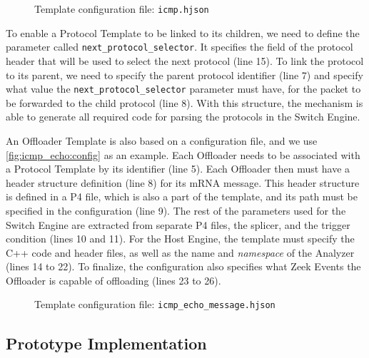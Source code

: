 \begin{figure}[htb]
    \caption{Template configuration file: \texttt{icmp.hjson}}
    \begin{center}
        
    \end{center}
    \label{fig:icmp_template:config}
\end{figure}

To enable a Protocol Template to be linked to its children, we need to define the parameter called \texttt{next\_protocol\_selector}. It specifies the field of the protocol header that will be used to select the next protocol (line 15). To link the protocol to its parent, we need to specify the parent protocol identifier (line 7) and specify what value the \texttt{next\_protocol\_selector} parameter must have, for the packet to be forwarded to the child protocol (line 8). With this structure, the mechanism is able to generate all required code for parsing the protocols in the Switch Engine.

An Offloader Template is also based on a configuration file, and we use \autoref{fig:icmp_echo:config} as an example. Each Offloader needs to be associated with a Protocol Template by its identifier (line 5). Each Offloader then must have a header structure definition (line 8) for its mRNA message. This header structure is defined in a P4 file, which is also a part of the template, and its path must be specified in the configuration (line 9). The rest of the parameters used for the Switch Engine are extracted from separate P4 files, the splicer, and the trigger condition (lines 10 and 11). For the Host Engine, the template must specify the C++ code and header files, as well as the name and \textit{namespace} of the Analyzer (lines 14 to 22). To finalize, the configuration also specifies what Zeek Events the Offloader is capable of offloading (lines 23 to 26).

\begin{figure}[htb]
    \caption{Template configuration file: \texttt{icmp\_echo\_message.hjson}}
    \begin{center}
        
    \end{center}
    \label{fig:icmp_echo:config}
\end{figure}

\subsection{Prototype Implementation}

